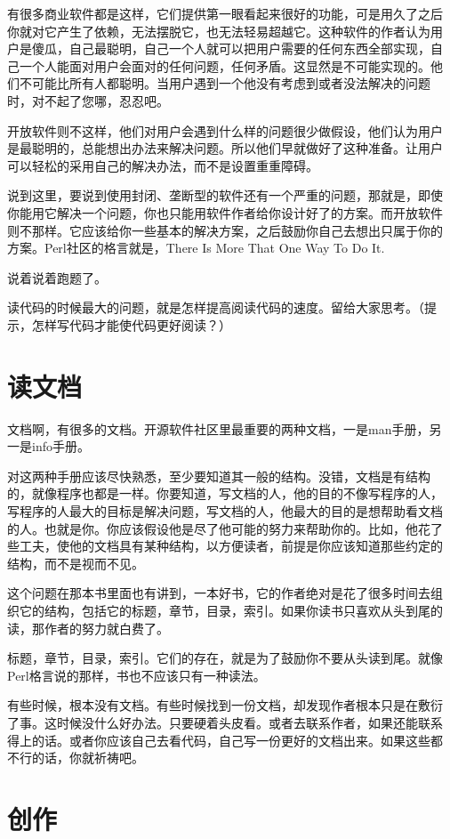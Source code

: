 \documentclass[10pt]{article}
\begin{document}
\begin{CJK*}{UTF8}{simhei}
有很多商业软件都是这样，它们提供第一眼看起来很好的功能，可是用久了之后
你就对它产生了依赖，无法摆脱它，也无法轻易超越它。这种软件的作者认为用
户是傻瓜，自己最聪明，自己一个人就可以把用户需要的任何东西全部实现，自
己一个人能面对用户会面对的任何问题，任何矛盾。这显然是不可能实现的。他
们不可能比所有人都聪明。当用户遇到一个他没有考虑到或者没法解决的问题
时，对不起了您哪，忍忍吧。

开放软件则不这样，他们对用户会遇到什么样的问题很少做假设，他们认为用户
是最聪明的，总能想出办法来解决问题。所以他们早就做好了这种准备。让用户
可以轻松的采用自己的解决办法，而不是设置重重障碍。

说到这里，要说到使用封闭、垄断型的软件还有一个严重的问题，那就是，即使
你能用它解决一个问题，你也只能用软件作者给你设计好了的方案。而开放软件
则不那样。它应该给你一些基本的解决方案，之后鼓励你自己去想出只属于你的
方案。Perl社区的格言就是，There Is More That One Way To Do It.

说着说着跑题了。

读代码的时候最大的问题，就是怎样提高阅读代码的速度。留给大家思考。（提
  示，怎样写代码才能使代码更好阅读？）

\section{读文档}

文档啊，有很多的文档。开源软件社区里最重要的两种文档，一是man手册，另
一是info手册。

对这两种手册应该尽快熟悉，至少要知道其一般的结构。没错，文档是有结构
的，就像程序也都是一样。你要知道，写文档的人，他的目的不像写程序的人，
写程序的人最大的目标是解决问题，写文档的人，他最大的目的是想帮助看文档
的人。也就是你。你应该假设他是尽了他可能的努力来帮助你的。比如，他花了
些工夫，使他的文档具有某种结构，以方便读者，前提是你应该知道那些约定的
结构，而不是视而不见。

这个问题在那本书里面也有讲到，一本好书，它的作者绝对是花了很多时间去组
织它的结构，包括它的标题，章节，目录，索引。如果你读书只喜欢从头到尾的
读，那作者的努力就白费了。

标题，章节，目录，索引。它们的存在，就是为了鼓励你不要从头读到尾。就像
Perl格言说的那样，书也不应该只有一种读法。

有些时候，根本没有文档。有些时候找到一份文档，却发现作者根本只是在敷衍
了事。这时候没什么好办法。只要硬着头皮看。或者去联系作者，如果还能联系
得上的话。或者你应该自己去看代码，自己写一份更好的文档出来。如果这些都
不行的话，你就祈祷吧。

\section{创作}


\end{CJK*}
\end{document}
